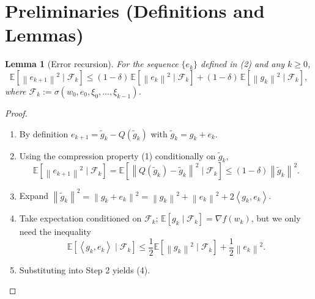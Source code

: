 \documentclass{article}
\newtheorem{lemma}{Lemma}
\newcommand{\E}{\mathbb{E}}
\newcommand{\norm}[1]{\left\|#1\right\|}
\newcommand{\inner}[2]{\left\langle #1,#2\right\rangle}
\begin{document}
\section*{Preliminaries (Definitions and Lemmas)}
\begin{lemma}[Error recursion]\label{lem:error-bound}
For the sequence $\{e_k\}$ defined in (2) and any $k\ge0$,
\[
\E\!\left[\norm{e_{k+1}}^2\mid \mathcal{F}_k\right]
\le (1-\delta)\,\E\!\left[\norm{e_k}^2\mid\mathcal{F}_k\right]
      + (1-\delta)\,\E\!\left[\norm{g_k}^2\mid\mathcal{F}_k\right],
\tag{4}
\]
where $\mathcal{F}_k:=\sigma(w_0,e_0,\xi_0,\dots,\xi_{k-1})$.
\end{lemma}
\begin{proof}
\begin{enumerate}
\item[Step 1.] By definition $e_{k+1}= \tilde g_k-Q(\tilde g_k)$ with $\tilde g_k=g_k+e_k$.
\item[Step 2.] Using the compression property (1) conditionally on $\tilde g_k$,
\[
\E\!\left[\norm{e_{k+1}}^2\mid\mathcal{F}_k\right]
= \E\!\left[\norm{Q(\tilde g_k)-\tilde g_k}^2\mid\mathcal{F}_k\right]
\le (1-\delta)\norm{\tilde g_k}^2 .
\]
\item[Step 3.] Expand $\norm{\tilde g_k}^2 = \norm{g_k+e_k}^2 = \norm{g_k}^2+\norm{e_k}^2+2\inner{g_k}{e_k}$.
\item[Step 4.] Take expectation conditioned on $\mathcal{F}_k$; $\E[g_k\mid\mathcal{F}_k]=\nabla f(w_k)$, but we only need the inequality
\[
\E\!\left[\inner{g_k}{e_k}\mid\mathcal{F}_k\right]\le \frac12\E\!\left[\norm{g_k}^2\mid\mathcal{F}_k\right]
+ \frac12\norm{e_k}^2 .
\]
\item[Step 5.] Substituting into Step 2 yields (4).
\end{enumerate}
\end{proof}
\end{document}
